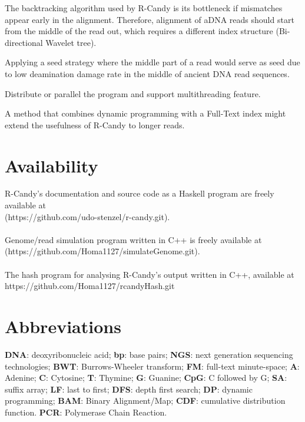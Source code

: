 \documentclass[11pt,a4paper]{report}
\begin{document}
The backtracking algorithm used by R-Candy is its bottleneck if mismatches 
appear early in the alignment. 
Therefore, alignment of aDNA reads should start from the middle of the read 
out, which requires a different index structure (Bi-directional Wavelet tree).

Applying a seed strategy where the middle part of a read would serve as seed
due to low deamination damage rate in the middle of  ancient DNA read sequences.

Distribute or parallel the program and support multithreading feature.

A method that combines dynamic programming with a Full-Text index might extend
the usefulness of R-Candy to longer reads.


\section{Availability} \label{Availability}

R-Candy's documentation and source code as a Haskell program are freely
available at\\
 (https://github.com/udo-stenzel/r-candy.git).
\\\\
Genome/read simulation program written in C++ is freely available at
(https://github.com/Homa1127/simulateGenome.git).
\\\\
The hash program for analysing R-Candy's output written in C++, available at
https://github.com/Homa1127/rcandyHash.git




\section{Abbreviations} \label{Abbreviations}

\textbf{DNA}: deoxyribonucleic acid;
\textbf{bp}: base pairs;
\textbf{NGS}: next generation sequencing technologies;
\textbf{BWT}: Burrows-Wheeler transform;
\textbf{FM}: full-text minute-space;
\textbf{A}: Adenine;
\textbf{C}: Cytosine;
\textbf{T}: Thymine;
\textbf{G}: Guanine;
\textbf{CpG}: C followed by G;
\textbf{SA}: suffix array;
\textbf{LF}: last to first;
\textbf{DFS}: depth first search;
\textbf{DP}: dynamic programming;
\textbf{BAM}: Binary Alignment/Map;
\textbf{CDF}: cumulative distribution function.
\textbf{PCR}: Polymerase Chain Reaction.
\end{document}
